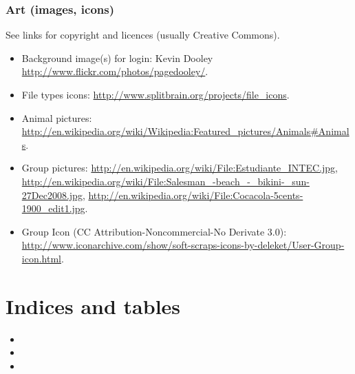 \documentclass[a4paper,12pt,english]{sphinxmanual}
\begin{document}
\section{Art (images, icons)}
\label{credits:art-images-icons}
See links for copyright and licences (usually Creative Commons).
\begin{itemize}
\item {} 
Background image(s) for login:
Kevin Dooley \href{http://www.flickr.com/photos/pagedooley/}{http://www.flickr.com/photos/pagedooley/}.

\item {} 
File types icons:
\href{http://www.splitbrain.org/projects/file\_icons}{http://www.splitbrain.org/projects/file\_icons}.

\item {} 
Animal pictures:
\href{http://en.wikipedia.org/wiki/Wikipedia:Featured\_pictures/Animals\#Animals}{http://en.wikipedia.org/wiki/Wikipedia:Featured\_pictures/Animals\#Animals}.

\item {} 
Group pictures:
\href{http://en.wikipedia.org/wiki/File:Estudiante\_INTEC.jpg}{http://en.wikipedia.org/wiki/File:Estudiante\_INTEC.jpg},
\href{http://en.wikipedia.org/wiki/File:Salesman\_-beach\_-\_bikini-\_sun-27Dec2008.jpg}{http://en.wikipedia.org/wiki/File:Salesman\_-beach\_-\_bikini-\_sun-27Dec2008.jpg},
\href{http://en.wikipedia.org/wiki/File:Cocacola-5cents-1900\_edit1.jpg}{http://en.wikipedia.org/wiki/File:Cocacola-5cents-1900\_edit1.jpg}.

\item {} 
Group Icon (CC Attribution-Noncommercial-No Derivate 3.0):
\href{http://www.iconarchive.com/show/soft-scraps-icons-by-deleket/User-Group-icon.html}{http://www.iconarchive.com/show/soft-scraps-icons-by-deleket/User-Group-icon.html}.

\end{itemize}


\part{Indices and tables}
\label{index:indices-and-tables}\begin{itemize}
\item {} 

\item {} 

\item {} 

\end{itemize}



\renewcommand{\indexname}{Index}
\printindex
\end{document}

